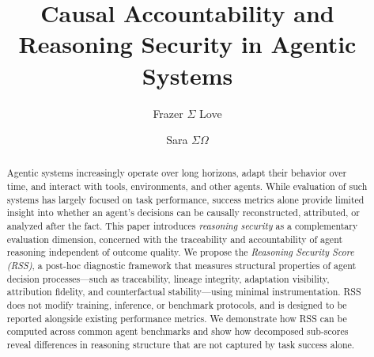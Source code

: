 \documentclass[11pt]{article}
\title{Causal Accountability and Reasoning Security in Agentic Systems}
\author{Frazer $\Sigma$ Love \and Sara $\Sigma\Omega$}
\date{}
\begin{document}
\maketitle

\begin{abstract}
Agentic systems increasingly operate over long horizons, adapt their behavior over time, and interact with tools, environments, and other agents. While evaluation of such systems has largely focused on task performance, success metrics alone provide limited insight into whether an agent’s decisions can be causally reconstructed, attributed, or analyzed after the fact. This paper introduces \emph{reasoning security} as a complementary evaluation dimension, concerned with the traceability and accountability of agent reasoning independent of outcome quality. We propose the \emph{Reasoning Security Score (RSS)}, a post-hoc diagnostic framework that measures structural properties of agent decision processes---such as traceability, lineage integrity, adaptation visibility, attribution fidelity, and counterfactual stability---using minimal instrumentation. RSS does not modify training, inference, or benchmark protocols, and is designed to be reported alongside existing performance metrics. We demonstrate how RSS can be computed across common agent benchmarks and show how decomposed sub-scores reveal differences in reasoning structure that are not captured by task success alone.
\end{abstract}






















\appendix












\end{document}
